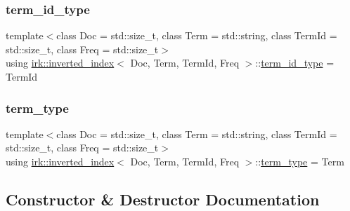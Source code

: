 \subsubsection{\texorpdfstring{term\+\_\+id\+\_\+type}{term\_id\_type}}
{\footnotesize\ttfamily template$<$class Doc  = std\+::size\+\_\+t, class Term  = std\+::string, class Term\+Id  = std\+::size\+\_\+t, class Freq  = std\+::size\+\_\+t$>$ \\
using \mbox{\hyperlink{classirk_1_1inverted__index}{irk\+::inverted\+\_\+index}}$<$ Doc, Term, Term\+Id, Freq $>$\+::\mbox{\hyperlink{classirk_1_1inverted__index_aac7579f5261c795a6f19a7f700b57b2b}{term\+\_\+id\+\_\+type}} =  Term\+Id}

\mbox{\label{classirk_1_1inverted__index_a7a60c2cec1774c08f21e8e27ccb5ac33}} 
\subsubsection{\texorpdfstring{term\+\_\+type}{term\_type}}
{\footnotesize\ttfamily template$<$class Doc  = std\+::size\+\_\+t, class Term  = std\+::string, class Term\+Id  = std\+::size\+\_\+t, class Freq  = std\+::size\+\_\+t$>$ \\
using \mbox{\hyperlink{classirk_1_1inverted__index}{irk\+::inverted\+\_\+index}}$<$ Doc, Term, Term\+Id, Freq $>$\+::\mbox{\hyperlink{classirk_1_1inverted__index_a7a60c2cec1774c08f21e8e27ccb5ac33}{term\+\_\+type}} =  Term}



\subsection{Constructor \& Destructor Documentation}
\mbox{\label{classirk_1_1inverted__index_ac94a8b0156be9f9afb99cb0070cc097b}} 
